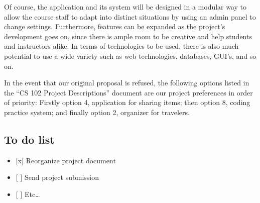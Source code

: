 \documentclass[12pt]{article}
\begin{document}
    \noindent Of course, the application and its system will be designed in a modular
    way to allow the course staff to adapt into distinct situations by using
    an admin panel to change settings. Furthermore, features can be expanded
    as the project's development goes on, since there is ample room to be
    creative and help students and instructors alike. In terms of
    technologies to be used, there is also much potential to use a wide
    variety such as web technologies, databases, GUI's, and so on. \newline
    
    \noindent In the event that our original proposal is refused, the following
    options listed in the ``CS 102 Project Descriptions'' document are our
    project preferences in order of priority: Firstly option 4, application
    for sharing items; then option 8, coding practice system; and finally
    option 2, organizer for travelers.
    
    \subsection*{To do list}\label{to-do-list}
    
    \begin{itemize}
        \itemsep1pt\parskip0pt
        \item
          {[}x{]} Reorganize project document
        \item
          {[} {]} Send project submission
        \item
          {[} {]} Etc\ldots{}
    \end{itemize}
\end{document}
